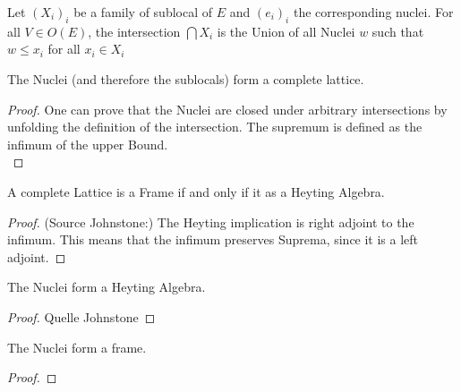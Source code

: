 \begin{definition}
    \label{def:sublocal_intersection}
    \leanok
    Let $(X_i)_i$ be a family of sublocal of $E$ and $(e_i)_i$ the corresponding nuclei.
    For all $V \in O(E)$, the intersection $\bigcap X_i$ is the Union of all Nuclei $w$ such that $w \le x_i $ for all $x_i \in X_i $
\end{definition}

\begin{lemma}
    \mathlibok
    \label{lem:nucleus_complete_lattice}
    \leanok
    The Nuclei (and therefore the sublocals) form a complete lattice.
\end{lemma}
\begin{proof}
    One can prove that the Nuclei are closed under arbitrary intersections by unfolding the definition of the intersection. The supremum is defined as the infimum of the upper Bound. \\
    \leanok
\end{proof}

\begin{proposition}
    \label{prop:complete_heyting_algebra}
    \mathlibok
    \leanok
    A complete Lattice is a Frame if and only if it as a Heyting Algebra.
\end{proposition}
\begin{proof}
(Source Johnstone:) The Heyting implication is right adjoint to the infimum. This means that the infimum preserves
Suprema, since it is a left adjoint.
    \leanok
        \mathlibok

\end{proof}


\begin{lemma}
    \label{lem:nucleus_heyting_algebra}
    \leanok
    \mathlibok
    The Nuclei form a Heyting Algebra.
\end{lemma}
\begin{proof}
    \leanok
    Quelle Johnstone
\end{proof}


\begin{lemma}
    \label{lem:nucleus_frame}
    \mathlibok
    \leanok
    The Nuclei  form a frame.
\end{lemma}
\begin{proof}
    \leanok
\end{proof}

